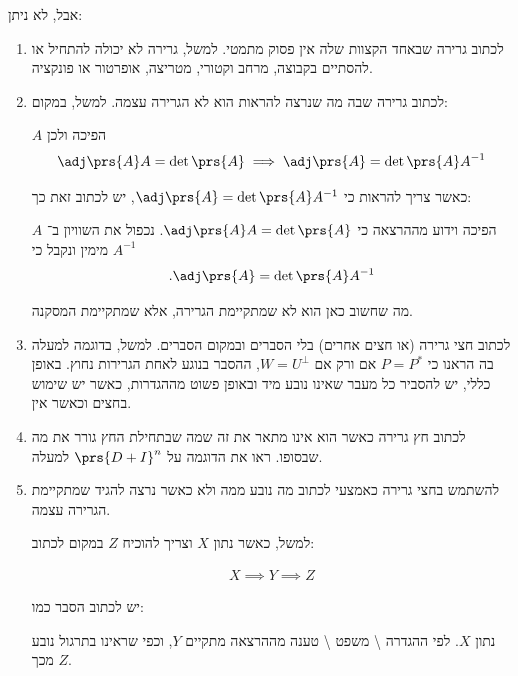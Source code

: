 \documentclass[a4paper,10pt,twoside,openany]{article}
\renewenvironment{quote}
  {\begin{tcolorbox}[
      colback=white,
      colframe=black,
      boxrule=0.5pt,
      left=2mm,
      right=2mm,
      top=1mm,
      bottom=1mm
    ]}
  {\end{tcolorbox}}
\begin{document}
אבל, לא ניתן:
\begin{enumerate}
\item לכתוב גרירה שבאחד הקצוות שלה אין פסוק מתמטי.
למשל, גרירה לא יכולה להתחיל או להסתיים בקבוצה, מרחב וקטורי, מטריצה, אופרטור או פונקציה.

\item לכתוב גרירה שבה מה שנרצה להראות הוא לא הגרירה עצמה. למשל, במקום:
\begin{quote}
$A$
הפיכה ולכן
\begin{align*}
\adj\prs{A} A = \det\prs{A} \implies \adj\prs{A} = \det\prs{A} A^{-1}
\end{align*}
\end{quote}
כאשר צריך להראות כי
$\adj\prs{A} = \det\prs{A} A^{-1}$,
יש לכתוב זאת כך:
\begin{quote}
$A$
הפיכה וידוע מההרצאה כי
$\adj\prs{A} A = \det\prs{A}$.
נכפול את השוויון ב־%
$A^{-1}$
מימין ונקבל כי
\begin{align*}
\text{.} \adj\prs{A} = \det\prs{A} A^{-1}
\end{align*}
\end{quote}
מה שחשוב כאן הוא לא שמתקיימת הגרירה, אלא שמתקיימת המסקנה.

\item לכתוב חצי גרירה (או חצים אחרים) בלי הסברים ובמקום הסברים.
למשל, בדוגמה למעלה בה הראנו כי
$P = P^*$
אם ורק אם
$W = U^\perp$,
ההסבר בנוגע לאחת הגרירות נחוץ. באופן כללי, יש להסביר כל מעבר שאינו נובע מיד ובאופן פשוט מההגדרות, כאשר יש שימוש בחצים וכאשר אין.

\item לכתוב חץ גרירה כאשר הוא אינו מתאר את זה שמה שבתחילת החץ גורר את מה שבסופו. ראו את הדוגמה על
$\prs{D+I}^n$
למעלה.

\item להשתמש בחצי גרירה כאמצעי לכתוב מה נובע ממה ולא כאשר נרצה להגיד שמתקיימת הגרירה עצמה.

למשל, כאשר נתון
$X$
וצריך להוכיח
$Z$
במקום לכתוב:
\begin{quote}
\begin{align*}
X \implies Y \implies Z
\end{align*}
\end{quote}
יש לכתוב הסבר כמו:
\begin{quote}
נתון
$X$.
לפי ההגדרה%
\textbackslash%
משפט%
\textbackslash%
טענה מההרצאה מתקיים
$Y$,
וכפי שראינו בתרגול נובע מכך
$Z$.
\end{quote}
\end{enumerate}
\end{document}

